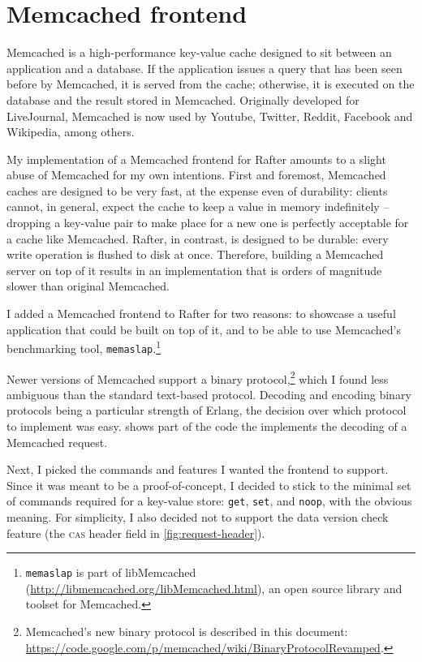 \documentclass[11pt,chapterprefix=true,toc=bibliography,numbers=noendperiod,
               footnotes=multiple,twoside]{scrreprt}
\begin{document}
\section{Memcached frontend}

Memcached is a high-performance key-value cache designed to sit between an application and a database. If the application issues a query that has been seen before by Memcached, it is served from the cache; otherwise, it is executed on the database and the result stored in Memcached. Originally developed for LiveJournal, Memcached is now used by Youtube, Twitter, Reddit, Facebook and Wikipedia, among others.

My implementation of a Memcached frontend for Rafter amounts to a slight abuse of Memcached for my own intentions. First and foremost, Memcached caches are designed to be very fast, at the expense even of durability: clients cannot, in general, expect the cache to keep a value in memory indefinitely -- dropping a key-value pair to make place for a new one is perfectly acceptable for a cache like Memcached. Rafter, in contrast, is designed to be durable: every write operation is flushed to disk at once. Therefore, building a Memcached server on top of it results in an implementation that is orders of magnitude slower than original Memcached.

I added a Memcached frontend to Rafter for two reasons: to showcase a useful application that could be built on top of it, and to be able to use Memcached's benchmarking tool, \texttt{memaslap}.\footnote{\texttt{memaslap} is part of libMemcached (\url{http://libmemcached.org/libMemcached.html}), an open source library and toolset for Memcached.}

Newer versions of Memcached support a binary protocol,\footnote{Memcached's new binary protocol is described in this document: \url{https://code.google.com/p/memcached/wiki/BinaryProtocolRevamped}.} which I found less ambiguous than the standard text-based protocol. Decoding and encoding binary protocols being a particular strength of Erlang, the decision over which protocol to implement was easy.  shows part of the code the implements the decoding of a Memcached request.

Next, I picked the commands and features I wanted the frontend to support. Since it was meant to be a proof-of-concept, I decided to stick to the minimal set of commands required for a key-value store: \texttt{get}, \texttt{set}, and \texttt{noop}, with the obvious meaning. For simplicity, I also decided not to support the data version check feature (the \textsc{cas} header field in \cref{fig:request-header}).
\end{document}
